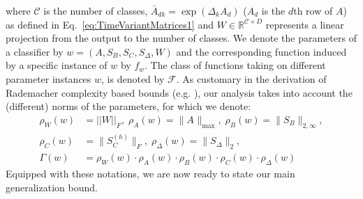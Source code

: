 %
where $\mathcal{C}$ is the number of classes, $ \bar{A}^{}_{dk} = \exp(\Delta_k A_d)$ ($A_d$ is the $d$th row of $A$) as defined in Eq.~\ref{eq:TimeVariantMatrices1} and $W \in \mathbb{R}^{\mathcal{C} \times D}$ represents a linear projection from the output to the number of classes.
We denote the parameters of a classifier by 
$w  = \left(A, S_B, S_C, S_{\Delta}, W\right)$
and the corresponding function induced by a specific instance of $w$ by $f_w$.
The class of functions taking on different parameter instances $w$, is denoted by $\mathcal{F}$.
As customary in the derivation of Rademacher complexity based bounds (e.g. \citep{golowich2018size}), our analysis takes into account the (different) norms of the parameters, for which we 
denote:
\vspace{-3pt}
{\small
\begin{equation}\nonumber
\begin{aligned}
    \rho_W(w)&=||W||_{F},\; \rho_A^{}(w) = \|A^{}\|_{\max},\; \rho_B^{}(w) = \|S_B^{}\|_{2,\infty}, \\ \rho_C^{}(w) &= \|S_C^{(h)}\|_{F},\;
    \rho_{\Delta}^{}(w) = \|S_{\Delta}^{}\|_{2}, \\ \Gamma(w) &=  \rho_W(w) \cdot \rho_A^{}(w) \cdot \rho_B^{}(w) \cdot \rho_C^{}(w) \cdot \rho_{\Delta}^{}(w)
\end{aligned}
\end{equation}
}
Equipped with these notations, we are now ready to state our main generalization bound.
